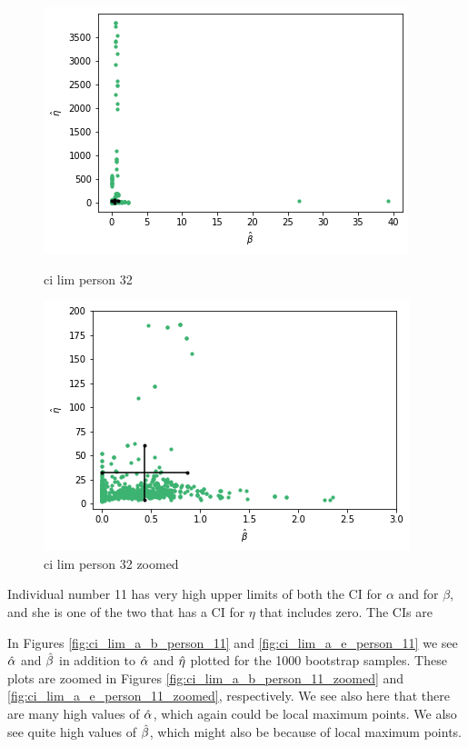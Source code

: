 \begin{figure}
    \centering
    \begin{minipage}{0.48\textwidth}
        \centering
        \includegraphics[scale=0.37]{pictures/ci_lim_b_e_person32.png}
        \caption{ci lim person 32}
        \label{fig:ci_lim_b_e_person_32}
    \end{minipage}\hfill
    \begin{minipage}{0.48\textwidth}
        \centering
        \includegraphics[scale=0.37]{pictures/ci_lim_b_e_person32_zoomed.png}
        \caption{ci lim person 32 zoomed}
        \label{fig:ci_lim_b_e_person_32_zoomed}
    \end{minipage}
\end{figure}

Individual number 11 has very high upper limits of both the CI for $\alpha$ and for $\beta$, and she is one of the two that has a CI for $\eta$ that includes zero. The CIs are


In Figures \ref{fig:ci_lim_a_b_person_11} and \ref{fig:ci_lim_a_e_person_11} we see $\hat{\alpha}$ and $\hat{\beta}$ in addition to $\hat{\alpha}$ and $\hat{\eta}$ plotted for the 1000 bootstrap samples. These plots are zoomed in Figures \ref{fig:ci_lim_a_b_person_11_zoomed} and \ref{fig:ci_lim_a_e_person_11_zoomed}, respectively. We see also here that there are many high values of $\hat{\alpha}$, which again could be local maximum points. We also see quite high values of $\hat{\beta}$, which might also be because of local maximum points. 


